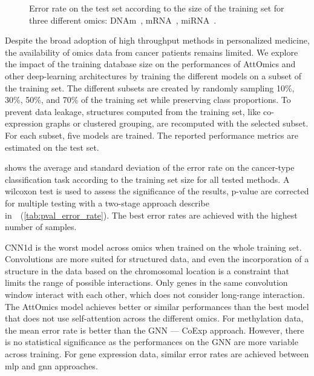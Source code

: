 \documentclass[../main.tex]{subfiles}
\begin{document}
		\begin{figure}[htbp]
			\centering
			\begin{subcaptiongroup}
				\ifSubfilesClassLoaded{%
				}{
				}
				\label{fig:limit_train_classif_A}
				\label{fig:limit_train_classif_B}
				\label{fig:limit_train_classif_C}
			\end{subcaptiongroup}
			\caption[Error rate comaprison of various architectures according to the training size]{Error rate on the test set according to the size of the training set for three different omics: DNAm~, mRNA~, miRNA~.}\label{fig:limit_train_classif}
		\end{figure}

		Despite the broad adoption of high throughput methods in personalized medicine, the availability of omics data from cancer patients remains limited.
		We explore the impact of the training database size on the performances of AttOmics and other deep-learning architectures by training the different models on a subset of the training set.
		The different subsets are created by randomly sampling 10\%, 30\%, 50\%, and 70\% of the training set while preserving class proportions.
		To prevent data leakage, structures computed from the training set, like co-expression graphs or clustered grouping, are recomputed with the selected subset.
		For each subset, five models are trained.
		The reported performance metrics are estimated on the test set.

		 shows the average and standard deviation of the error rate on the cancer-type classification task according to the training set size for all tested methods.
		A wilcoxon test is used to assess the significance of the results, p-value are corrected for multiple testing with a two-stage approach describe in~\cite{10.2307/2346101}~(\cref{tab:pval_error_rate}).
		The best error rates are achieved with the highest number of samples.

		CNN1d is the worst model across omics when trained on the whole training set.
		Convolutions are more suited for structured data, and even the incorporation of a structure in the data based on the chromosomal location is a constraint that limits the range of possible interactions.
		Only genes in the same convolution window interact with each other, which does not consider long-range interaction.
		The AttOmics model achieves better or similar performances than the best model that does not use self-attention across the different omics.
		For methylation data, the mean error rate is better than the GNN --- CoExp approach.
		However, there is no statistical significance as the performances on the GNN are more variable across training.
		For gene expression data, similar error rates are achieved between \gls{mlp} and \gls{gnn} approaches.
\end{document}

